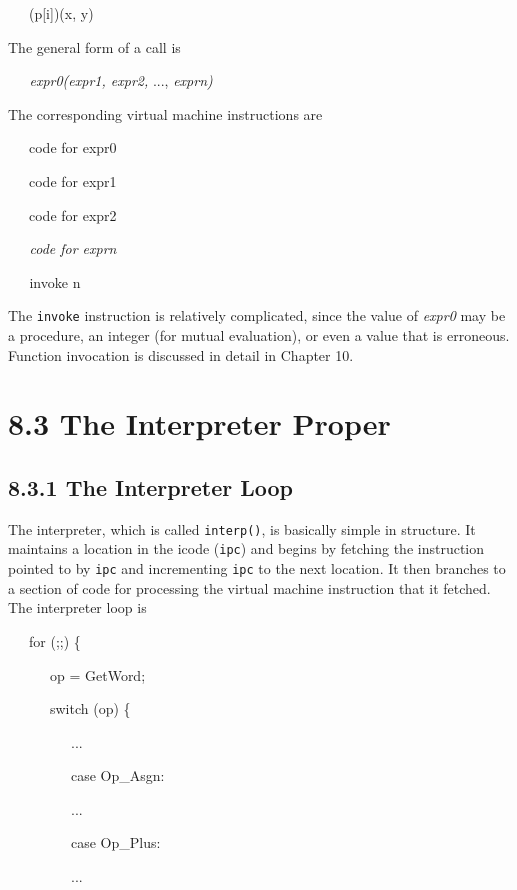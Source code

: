 {\ttfamily\mdseries
\ \ \ (p[i])(x, y)}

The general form of a call is

{\ttfamily\mdseries
\textit{\ \ \ expr0(expr1, expr2, }..., \textit{exprn)}}

The corresponding virtual machine instructions are

{\ttfamily\mdseries
\ \ \ code for expr0}

{\ttfamily\mdseries
\ \ \ code for expr1}

{\ttfamily\mdseries
\ \ \ code for expr2}

{\ttfamily\itshape
\ \ \ code for exprn}

{\ttfamily\mdseries
\textit{\ \ \ }invoke n}

The \texttt{invoke} instruction is relatively complicated, since the
value of \textit{expr0 }may be a procedure, an integer (for mutual
evaluation), or even a value that is erroneous. Function invocation is
discussed in detail in Chapter 10.

\section[8.3 The Interpreter Proper]{8.3 The Interpreter Proper}
\subsection[8.3.1 The Interpreter Loop]{8.3.1 The Interpreter Loop}

The interpreter, which is called \texttt{interp()}, is basically
simple in structure. It maintains a location in the icode
(\texttt{ipc}) and begins by fetching the instruction pointed to by
\texttt{ipc} and incrementing \texttt{ipc} to the next location. It
then branches to a section of code for processing the virtual machine
instruction that it fetched. The interpreter loop is

{\ttfamily\mdseries
\ \ \ for (;;) \{}

{\ttfamily\mdseries
\ \ \ \ \ \ op = GetWord;}

{\ttfamily\mdseries
\ \ \ \ \ \ switch (op) \{}

{\ttfamily\mdseries
\ \ \ \ \ \ \ \ \ ...}

{\ttfamily\mdseries
\ \ \ \ \ \ \ \ \ case Op\_Asgn:}

{\ttfamily\mdseries
\ \ \ \ \ \ \ \ \ ...}

{\ttfamily\mdseries
\ \ \ \ \ \ \ \ \ case Op\_Plus:}

{\ttfamily\mdseries
\ \ \ \ \ \ \ \ \ ...}

